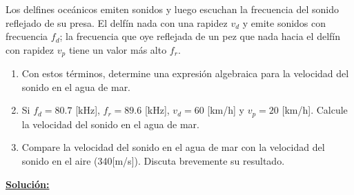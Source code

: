 \begin{minipage}{\textwidth}
		
		\item Los delfines oceánicos emiten sonidos y luego escuchan la frecuencia del sonido reflejado de su presa. El delfín nada con una rapidez $v_d$ y emite sonidos con frecuencia $f_d$; la frecuencia que oye reflejada de un pez que nada hacia el delfín con rapidez $v_p$ tiene un valor más alto $f_r$.

		\begin{enumerate}
			\item Con estos términos, determine una expresión algebraica para la velocidad del sonido en el agua de mar.
			\item Si $f_d = 80.7$ [kHz], $f_r = 89.6$ [kHz], $v_d= 60$ [km/h] y $v_p=20$ [km/h]. Calcule la velocidad del sonido en el agua de mar.
			\item Compare la velocidad del sonido en el agua de mar con la velocidad del sonido en el aire (340[m/s]). Discuta brevemente su resultado.
		\end{enumerate}
		
\end{minipage}

\textbf{\underline{Solución:}}

